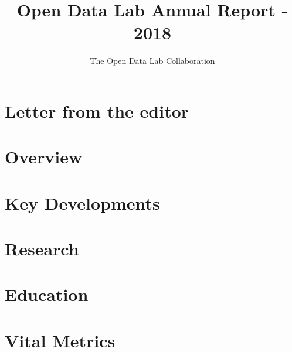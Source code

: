 \documentclass[12pt,letterpaper]{report} %
\title{Open Data Lab Annual Report - 2018}
\author{The Open Data Lab Collaboration}
\begin{document}
\maketitle


\tableofcontents
\pagebreak

\chapter*{Letter from the editor}   %

\chapter{Overview} 

\chapter{Key Developments} 

\chapter{Research} 

\chapter{Education} 

\chapter{Vital Metrics} 

\end{document}
